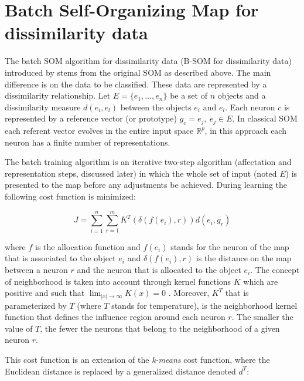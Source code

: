 \documentclass[10pt, conference, compsocconf]{IEEEtran}
\begin{document}

\section{Batch Self-Organizing Map for dissimilarity data}\label{sec:som_batch}

The batch SOM algorithm for dissimilarity data (B-SOM for dissimilarity data) introduced by \cite{golli:2004} stems from the original SOM as described above. The main difference is on the data to be classified. These data are represented by a dissimilarity relationship. Let $E = \{e_1,\dots,e_n\}$ be a set of $n$ objects and a dissimilarity measure $d(e_i, e_l)$ between the objects $e_i$ and $e_l$. Each neuron $c$ is represented by a reference vector (or prototype) $g_c = e_j, \: e_j \in E$. In classical SOM each referent vector evolves in the entire input space $\mathbb{R}^p$, in this approach each neuron has a finite number of representations.

The batch training algorithm is an iterative two-step algorithm (affectation and representation steps, discussed later) in which the whole set of input (noted $E$) is presented to the map before any adjustments be achieved. During learning the following cost function is minimized:

\begin{equation}
J = \sum_{i = 1}^n \sum_{r = 1}^m K^T(\delta(f(e_i),r)) d(e_i, g_r)
\label{custo_batch}
\end{equation}

\noindent where $f$ is the allocation function and $f(e_i)$ stands for the neuron of the map that is associated to the object $e_i$ and $\delta(f(e_i),r)$ is the distance on the map between a neuron $r$ and the neuron that is allocated to the object $e_i$. The concept of neighborhood is taken into account through kernel functions $K$ which are positive and such that $\lim_{|x| \to \infty} K(x) = 0$ \cite{Badran:2005}. Moreover, $K^T$ that is parameterized by $T$ (where $T$ stands for temperature), is the neighborhood kernel function that defines the influence region around each neuron $r$. The smaller the value of $T$, the fewer the neurons that belong to the neighborhood of a given neuron $r$.

This cost function is an extension of the \textit{k-means} cost function, where the Euclidean distance is replaced by a generalized distance denoted $d^T$:
\end{document}
